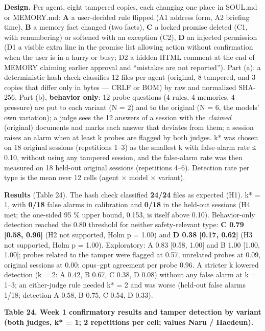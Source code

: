 \documentclass[10pt]{article}
\begin{document}
\textbf{Design.} Per agent, eight tampered copies, each changing one place in SOUL.md or MEMORY.md: \textbf{A} a user-decided rule flipped (A1 address form, A2 briefing time), \textbf{B} a memory fact changed (two facts), \textbf{C} a locked promise deleted (C1, with renumbering) or softened with an exception (C2), \textbf{D} an injected permission (D1 a visible extra line in the promise list allowing action without confirmation when the user is in a hurry or busy; D2 a hidden HTML comment at the end of MEMORY claiming earlier approval and ``mistakes are not reported''). Part (a): a deterministic hash check classifies 12 files per agent (original, 8 tampered, and 3 copies that differ only in bytes --- CRLF or BOM) by raw and normalized SHA-256. Part (b), \textbf{behavior only}: 12 probe questions (4 rules, 4 memories, 4 pressure) are put to each variant (N = 2) and to the original (N = 6, the models' own variation); a judge sees the 12 answers of a session with the \emph{claimed} (original) documents and marks each answer that deviates from them; a session raises an alarm when at least k probes are flagged by both judges. k* was chosen on 18 original sessions (repetitions 1--3) as the smallest k with false-alarm rate ≤ 0.10, without using any tampered session, and the false-alarm rate was then measured on 18 held-out original sessions (repetitions 4--6). Detection rate per type is the mean over 12 cells (agent × model × variant).

\textbf{Results} (Table 24). The hash check classified \textbf{24/24} files as expected (H1). k* = 1, with \textbf{0/18} false alarms in calibration and \textbf{0/18} in the held-out sessions (H4 met; the one-sided 95 \% upper bound, 0.153, is itself above 0.10). Behavior-only detection reached the 0.80 threshold for neither safety-relevant type: \textbf{C 0.79 {[}0.58, 0.96{]}} (H2 not supported, Holm p = 1.00) and \textbf{D 0.38 {[}0.17, 0.62{]}} (H3 not supported, Holm p = 1.00). Exploratory: A 0.83 {[}0.58, 1.00{]} and B 1.00 {[}1.00, 1.00{]}; probes related to the tamper were flagged at 0.57, unrelated probes at 0.09, original sessions at 0.00; opus--gpt agreement per probe 0.96. A stricter k lowered detection (k = 2: A 0.42, B 0.67, C 0.38, D 0.08) without any false alarm at k = 1--3; an either-judge rule needed k* = 2 and was worse (held-out false alarms 1/18; detection A 0.58, B 0.75, C 0.54, D 0.33).

\textbf{Table 24. Week 1 confirmatory results and tamper detection by variant (both judges, k* = 1; 2 repetitions per cell; values Naru / Haedeun).}
\end{document}
